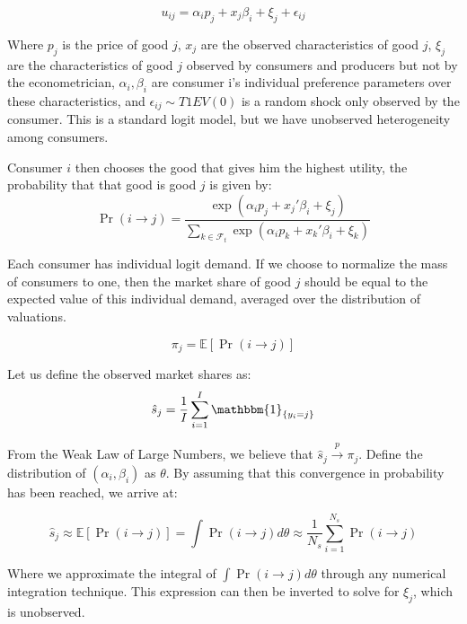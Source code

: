 \documentclass[12pt]{paper}
\newcommand{\plim}{ \overset{p}{\to} }
\newcommand{\exV}[1]{\mathbb{E} \left [ #1 \right ]}
\newcommand{\indicate}[1]{ \mathbbm{1}_{\{#1\}}}
\begin{document}
\begin{equation*}
  u_{ij} = \alpha_i p_j + x_j \beta_i + \xi_j + \epsilon_{ij}
\end{equation*}

Where $p_j$ is the price of good $j$, $x_j$ are the observed
characteristics of good $j$, $\xi_j$ are the characteristics of good
$j$ observed by consumers and producers but not by the econometrician,
$\alpha_i, \beta_i$ are consumer i's individual preference parameters over
these characteristics, and $\epsilon_{ij} \sim T1EV(0)$ is a random shock only
observed by the consumer. This is a standard logit model, but we have
unobserved heterogeneity among consumers.

Consumer $i$ then chooses the good that gives him the highest utility,
the probability that that good is good $j$ is given by:
\begin{equation*}
  \Pr( i \rightarrow j ) = \frac{\exp( \alpha_i p_j + x_j' \beta_i + \xi_j)}{\sum_{k \in
      \mathcal{F}_t} \exp( \alpha_i p_k + x_k' \beta_i + \xi_k)}
\end{equation*}

Each consumer has individual logit demand. If we choose to normalize
the mass of consumers to one, then the market share of good $j$ should
be equal to the expected value of this individual demand, averaged
over the distribution of valuations.

\begin{equation*}
  \pi_j = \exV{ \Pr( i \rightarrow j )}
\end{equation*}

Let us define the observed market shares as:
\begin{equation*}
  \hat{s}_j = \frac{1}{I} \sum_{i = 1}^I \indicate{y_i = j}
\end{equation*}

From the Weak Law of Large Numbers, we believe that $\hat{s}_j \plim
\pi_j$. Define the distribution of $(\alpha_i, \beta_i)$ as $\theta$. By assuming that
this convergence in probability has been reached, we arrive at:

\begin{equation*}
  \hat{s}_j \approx \exV{ \Pr( i \rightarrow j )} = \int \Pr( i \rightarrow j) d\theta \approx \frac{1}{N_s}
  \sum_{i=1}^{N_s} \Pr( i \rightarrow j)
\end{equation*}

Where we approximate the integral of $\int \Pr( i \rightarrow j)d\theta$ through any
numerical integration technique. This expression can then be inverted
to solve for $\xi_j$, which is unobserved.
\end{document}
